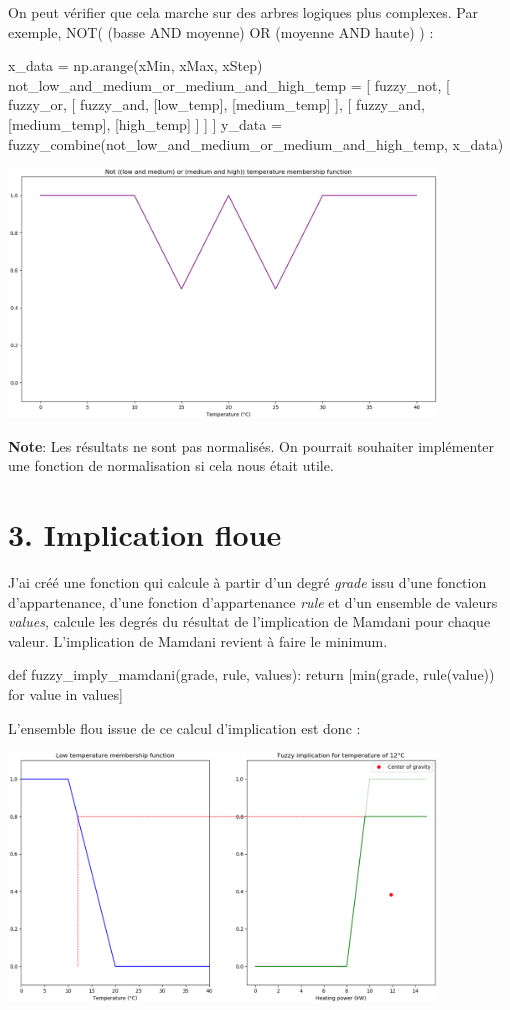 \documentclass[11pt]{report}
\begin{document}
\newpage
On peut vérifier que cela marche sur des arbres logiques plus complexes. Par exemple, NOT( (basse AND moyenne) OR (moyenne AND haute) ) :
\begin{pythoncode}
x_data = np.arange(xMin, xMax, xStep)
not_low_and_medium_or_medium_and_high_temp = [
	fuzzy_not,
	[
		fuzzy_or,
		[
			fuzzy_and,
			[low_temp],
			[medium_temp]
		],
		[
			fuzzy_and,
			[medium_temp],
			[high_temp]
		]
	]
]
y_data = fuzzy_combine(not_low_and_medium_or_medium_and_high_temp, x_data)
\end{pythoncode}
\begin{center}
	\includegraphics[height=250px]{fuzzy_combine}
\end{center}
\textbf{Note}: Les résultats ne sont pas normalisés. On pourrait souhaiter implémenter une fonction de normalisation si cela nous était utile.

\newpage
\section*{3. Implication floue}

J'ai créé une fonction qui calcule à partir d'un degré \textit{grade} issu d'une fonction d'appartenance, d'une fonction d'appartenance \textit{rule} et d'un ensemble de valeurs \textit{values}, calcule les degrés du résultat de l'implication de Mamdani pour chaque valeur. L'implication de Mamdani revient à faire le minimum.

\begin{pythoncode}
def fuzzy_imply_mamdani(grade, rule, values):
	return [min(grade, rule(value)) for value in values]
\end{pythoncode}

L'ensemble flou issue de ce calcul d'implication est donc : 
\begin{center}
	\includegraphics[height=250px]{gravity}
\end{center}
\end{document}
